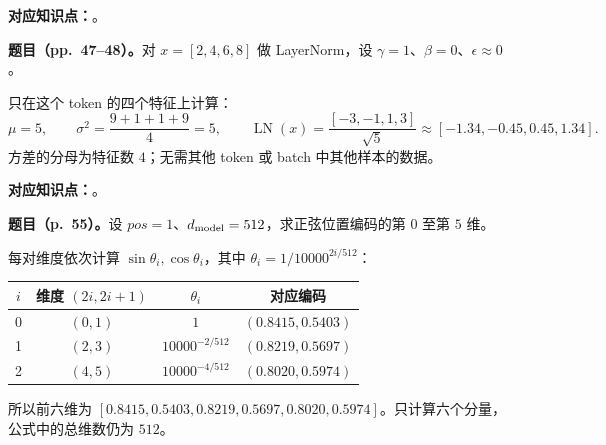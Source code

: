
\textbf{对应知识点：}。

\textbf{题目（pp.~47--48）。}对 $x=[2,4,6,8]$ 做 LayerNorm，设 $\gamma=1$、$\beta=0$、$\epsilon\approx0$。

\begin{workedsolution}
只在这个 token 的四个特征上计算：
\[
 \mu=5,\qquad \sigma^2=\frac{9+1+1+9}{4}=5,
 \qquad \operatorname{LN}(x)=\frac{[-3,-1,1,3]}{\sqrt5}
 \approx[-1.34,-0.45,0.45,1.34].
\]
方差的分母为特征数 $4$；无需其他 token 或 batch 中其他样本的数据。
\end{workedsolution}


\textbf{对应知识点：}。

\textbf{题目（p.~55）。}设 $pos=1$、$d_{\rm model}=512$，求正弦位置编码的第 $0$ 至第 $5$ 维。

\begin{workedsolution}
每对维度依次计算 $\sin\theta_i,\cos\theta_i$，其中 $\theta_i=1/10000^{2i/512}$：
\begin{center}
\begin{tabular}{@{}cccc@{}}
\toprule
$i$ & 维度 $(2i,2i+1)$ & $\theta_i$ & 对应编码 \\
\midrule
0 & $(0,1)$ & $1$ & $(0.8415,0.5403)$ \\
1 & $(2,3)$ & $10000^{-2/512}$ & $(0.8219,0.5697)$ \\
2 & $(4,5)$ & $10000^{-4/512}$ & $(0.8020,0.5974)$ \\
\bottomrule
\end{tabular}
\end{center}
所以前六维为 $[0.8415,0.5403,0.8219,0.5697,0.8020,0.5974]$。只计算六个分量，公式中的总维数仍为 $512$。
\end{workedsolution}
